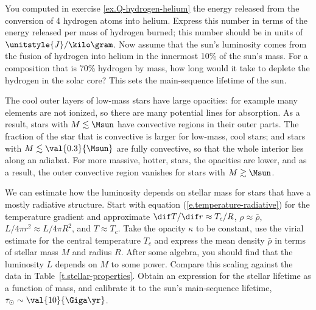 \begin{exercisebox}
\label{ex.nuclear-burning-timescale}
You computed in exercise \ref{ex.Q-hydrogen-helium} the energy released from the conversion of 4 hydrogen atoms into helium. Express this number in terms of the energy released per mass of hydrogen burned; this number should be in units of $\unitstyle{J}/\kilo\gram$. Now assume that the sun's luminosity comes from the fusion of hydrogen into helium in the innermost 10\% of the sun's mass. For a composition that is 70\% hydrogen by mass, how long would it take to deplete the hydrogen in the solar core? This sets the main-sequence lifetime of the sun.
\end{exercisebox}

The cool outer layers of low-mass stars have large opacities: for example many elements are not ionized, so there are many potential lines for absorption. As a result, stars with $M\lesssim\Msun$ have convective regions in their outer parts. The fraction of the star that is convective is larger for low-mass, cool stars; and stars with $M \lesssim\val{0.3}{\Msun}$ are fully convective, so that the whole interior lies along an adiabat. For more massive, hotter, stars, the opacities are lower, and as a result, the outer convective region vanishes for stars with $M\gtrsim\Msun$.

\begin{exercisebox}
\label{ex.mass-luminosity-relation}
We can estimate how the luminosity depends on stellar mass for stars that have a mostly radiative structure. Start with equation (\ref{e.temperature-radiative}) for the temperature gradient and approximate $\dif T/\dif r \approx T_{c}/R$, $\rho \approx \bar{\rho}$, $L/4\pi r^{2} \approx L/4\pi R^{2}$, and $T\approx T_{c}$. Take the opacity $\kappa$ to be constant,  use the virial estimate for the central temperature $T_{c}$ and express the mean density $\bar{\rho}$ in terms of stellar mass $M$ and radius $R$. After some algebra, you should find that the luminosity $L$ depends on $M$ to some power. Compare this scaling against the data in Table~\ref{t.stellar-properties}. Obtain an expression for the stellar lifetime as a function of mass, and calibrate it to the sun's main-sequence lifetime, $\tau_{\odot}\sim\val{10}{\Giga\yr}$.
\end{exercisebox}

